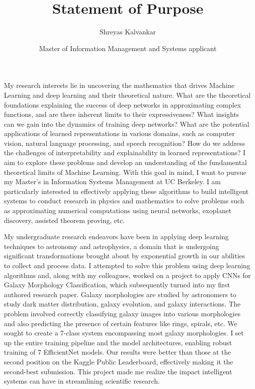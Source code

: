 \documentclass[11pt]{article}
\title{Statement of Purpose}
\author{Shreyas Kalvankar}
\date{Master of Information Management and Systems applicant}
\begin{document}
  \maketitle%
  \thispagestyle{empty}
  \vspace{5pt}

\hspace{0.25in}My research interests lie in uncovering the mathematics that drives Machine
Learning and deep learning and their theoretical nature. What are the
theoretical foundations explaining the success of deep networks in approximating
complex functions, and are there inherent limits to their expressiveness? What
insights can we gain into the dynamics of training deep networks? What are the
potential applications of learned representations in various domains, such as
computer vision, natural language processing, and speech recognition? How do we
address the challenges of interpretability and explainability in learned
representations? I aim to explore these problems and develop an understanding of
the fundamental theoretical limits of Machine Learning. With this goal in mind,
I want to pursue my Master’s in Information Systems Management at UC Berkeley. I
am particularly interested in effectively applying these algorithms to build
intelligent systems to conduct research in physics and mathematics to solve
problems such as approximating numerical computations using neural networks,
exoplanet discovery, assisted theorem proving, etc.

\hspace{0.25in}My undergraduate research endeavors have been in applying deep learning
techniques to astronomy and astrophysics, a domain that is undergoing
significant transformations brought about by exponential growth in our abilities
to collect and process data. I attempted to solve this problem using deep
learning algorithms and, along with my colleagues, worked on a project to apply
CNNs for Galaxy Morphology Classification, which subsequently turned into my
first authored research paper. Galaxy morphologies are studied by astronomers to
study dark matter distribution, galaxy evolution, and galaxy interactions. The
problem involved correctly classifying galaxy images into various morphologies
and also predicting the presence of certain features like rings, spirals, etc.
We sought to create a 7-class system encompassing most galaxy morphologies. I
set up the entire training pipeline and the model architectures, enabling robust
training of 7 EfficientNet models. Our results were better than those at the
second position on the Kaggle Public Leaderboard, effectively making it the
second-best submission. This project made me realize the impact intelligent
systems can have in streamlining scientific research. 
\end{document}
